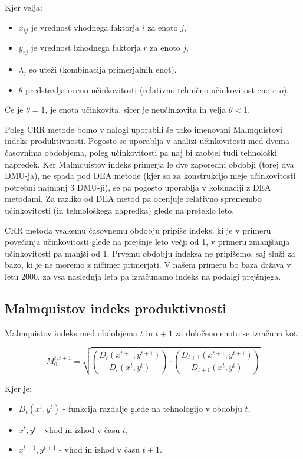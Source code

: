 \documentclass[12pt,a4paper]{article}
\theoremstyle{definition}
\begin{document}
Kjer velja:
\begin{itemize}
    \item \( x_{ij} \) je vrednost vhodnega faktorja \( i \) za enoto \( j \),
    \item \( y_{rj} \) je vrednost izhodnega faktorja \( r \) za enoto \( j \),
    \item \( \lambda_j \) so uteži (kombinacija primerjalnih enot),
    \item \( \theta \) predstavlja oceno učinkovitosti (relativno tehnično učinkovitost enote \( o \)).
\end{itemize}

Če je \( \theta = 1 \), je enota učinkovita, sicer je neučinkovita in velja \( \theta < 1 \).

Poleg CRR metode bomo v nalogi uporabili še tako imenovani Malmquistovi indeks produktivnosti.
Pogosto se uporablja v analizi učinkovitosti med dvema časovnima obdobjema, poleg učinkovitosti
pa naj bi zaobjel tudi tehnološki napredek. Ker Malmquistov indeks
primerja le dve zaporedni obdobji (torej dva DMU-ja), ne spada pod DEA metode
(kjer so za konstrukcijo meje učinkovitosti potrebni najmanj 3 DMU-ji), se pa pogosto uporablja
v kobinaciji z DEA metodami. Za razliko od DEA metod pa ocenjuje relativno spremembo učinkovitosti 
(in tehnološkega napredka) glede na preteklo leto. 

CRR metoda vsakemu časovnemu obdobju pripiše indeks, ki je v primeru povečanja učinkovitosti glede
na prejšnje leto večji od 1, v primeru zmanjšanja učinkovitosti pa manjši od 1. Prvemu obdobju
indeksa ne pripišemo, saj služi za bazo, ki je ne moremo z ničimer primerjati. V našem primeru bo baza 
država v letu 2000, za vsa naslednja leta pa izračunamo indeks na podalgi prejšnjega.

\subsection{Malmquistov indeks produktivnosti}

Malmquistov indeks med obdobjema \( t \) in \( t+1 \) za določeno enoto se izračuna kot:

\begin{equation*}
M_0^{t,t+1} = \sqrt{
\left( \frac{D_t(x^{t+1}, y^{t+1})}{D_t(x^t, y^t)} \right)
\cdot
\left( \frac{D_{t+1}(x^{t+1}, y^{t+1})}{D_{t+1}(x^t, y^t)} \right)
}
\end{equation*}

Kjer je:
\begin{itemize}
    \item \( D_t(x^t, y^t) \) - funkcija razdalje glede na tehnologijo v obdobju \( t \),
    \item \( x^t, y^t \) - vhod in izhod v času \( t \),
    \item \( x^{t+1}, y^{t+1} \) - vhod in izhod v času \( t+1 \).
\end{itemize}
\end{document}
